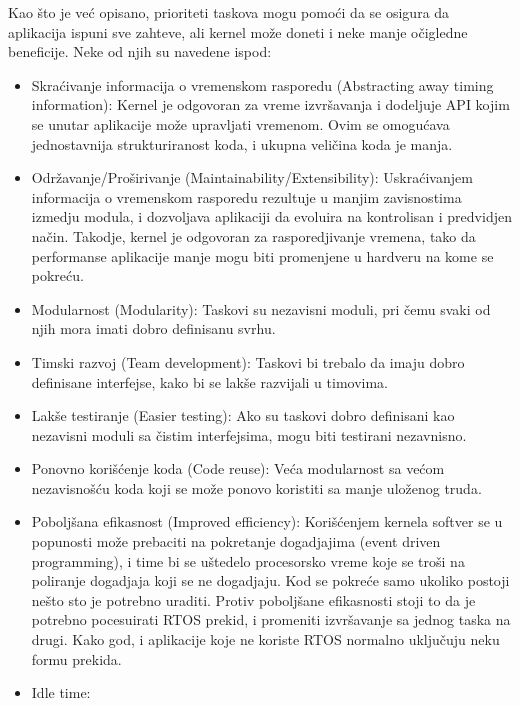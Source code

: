 \documentclass[a4paper,12pt, master]{etf}
\begin{document}
	Kao \v{s}to je ve\'{c} opisano, prioriteti taskova mogu pomo\'{c}i da se
	osigura da aplikacija ispuni sve zahteve, ali kernel mo\v{z}e doneti i neke
	manje o\v{c}igledne beneficije. Neke od njih su	navedene ispod:

	\begin{itemize}
		\item Skra\'{c}ivanje informacija o vremenskom rasporedu (Abstracting
		away timing information):
		Kernel je odgovoran za vreme izvr\v{s}avanja i dodeljuje API kojim se
		unutar aplikacije mo\v{z}e upravljati vremenom. Ovim se omogu\'{c}ava
		jednostavnija strukturiranost koda, i ukupna veli\v{c}ina koda je manja.
		\item Odr\v{z}avanje/Pro\v{s}irivanje (Maintainability/Extensibility):
		Uskra\'{c}ivanjem informacija o vremenskom rasporedu rezultuje u manjim
		zavisnostima izmedju modula, i dozvoljava aplikaciji da evoluira na
		kontrolisan i predvidjen na\v{c}in. Takodje, kernel je odgovoran za
		rasporedjivanje vremena, tako da performanse aplikacije manje mogu biti
		promenjene u hardveru na kome se pokre\'{c}u.
		\item Modularnost (Modularity):
		Taskovi su nezavisni moduli, pri \v{c}emu svaki od njih mora imati
		dobro definisanu svrhu.
		\item Timski razvoj (Team development):
		Taskovi bi trebalo da imaju dobro definisane interfejse, kako bi se
		lak\v{s}e razvijali u timovima.
		\item Lak\v{s}e testiranje (Easier testing):
		Ako su taskovi dobro definisani kao nezavisni moduli sa \v{c}istim
		interfejsima, mogu biti	testirani nezavnisno.
		\item Ponovno kori\v{s}\'{c}enje koda (Code reuse):
		Ve\'{c}a modularnost sa ve\'{c}om nezavisno\v{s}\'{c}u koda koji se
		mo\v{z}e ponovo koristiti sa manje ulo\v{z}enog truda.
		\item Pobolj\v{s}ana efikasnost (Improved efficiency):
		Kori\v{s}\'{c}enjem kernela softver se u popunosti mo\v{z}e prebaciti
		na pokretanje dogadjajima (event driven programming), i time bi se
		u\v{s}tedelo procesorsko vreme koje se tro\v{s}i na	poliranje dogadjaja
        koji se ne dogadjaju. Kod se pokre\'{c}e samo ukoliko postoji ne\v{s}to
		sto je potrebno	uraditi. Protiv pobolj\v{s}ane efikasnosti stoji to da
		je potrebno pocesuirati	RTOS prekid, i promeniti izvr\v{s}avanje sa
		jednog taska na drugi. Kako god, i aplikacije koje ne koriste RTOS
		normalno uklju\v{c}uju neku formu prekida.
		\item Idle time:

\end{itemize}
\end{document}
